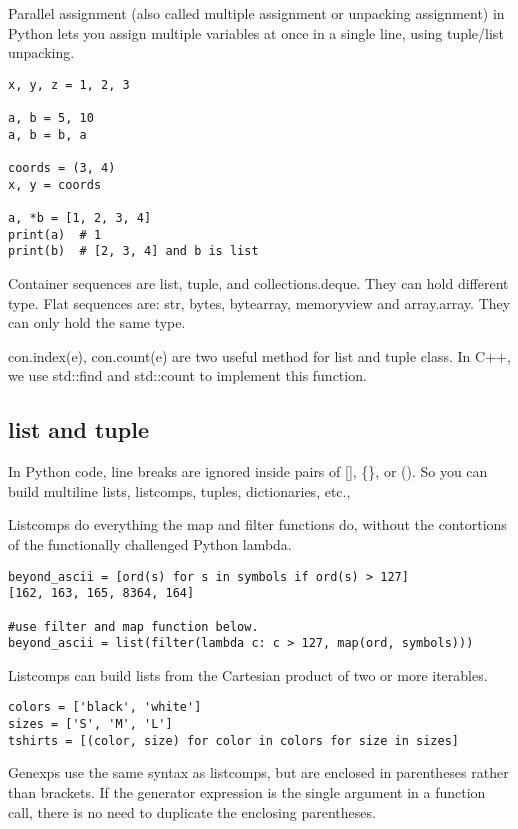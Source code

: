 \documentclass[a4paper,12pt,twoside]{book}
\begin{document}
Parallel assignment (also called multiple assignment or unpacking assignment) in Python lets you assign multiple variables at once in a single line, using tuple/list unpacking.

\begin{lstlisting}
x, y, z = 1, 2, 3

a, b = 5, 10
a, b = b, a

coords = (3, 4)
x, y = coords

a, *b = [1, 2, 3, 4]
print(a)  # 1
print(b)  # [2, 3, 4] and b is list
\end{lstlisting}
	
Container sequences are list, tuple, and collections.deque. They can hold different type. Flat sequences are: str, bytes, bytearray, memoryview and array.array. They can only hold the same type. 
	
con.index(e), con.count(e) are two useful method for list and tuple class. In C++, we use std::find and std::count to implement this function. 

\subsection{list and tuple}

In Python code, line breaks are ignored inside pairs of [], \{\}, or ().
So you can build multiline lists, listcomps, tuples, dictionaries, etc.,

Listcomps do everything the map and filter functions do, without the contortions of the functionally challenged Python lambda.

\begin{lstlisting}
beyond_ascii = [ord(s) for s in symbols if ord(s) > 127]
[162, 163, 165, 8364, 164]

#use filter and map function below.
beyond_ascii = list(filter(lambda c: c > 127, map(ord, symbols)))
\end{lstlisting}

Listcomps can build lists from the Cartesian product of two or more iterables.
\begin{lstlisting}
colors = ['black', 'white']
sizes = ['S', 'M', 'L']
tshirts = [(color, size) for color in colors for size in sizes]
\end{lstlisting}

Genexps use the same syntax as listcomps, but are enclosed in parentheses rather than brackets. If the generator expression is the single argument in a function call, there is no need to duplicate the enclosing parentheses.
\end{document}
